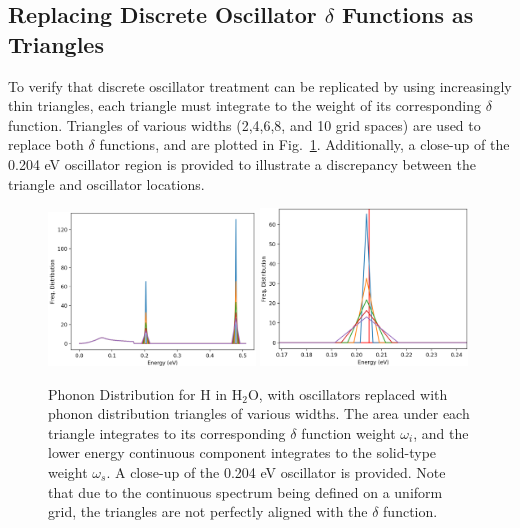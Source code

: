 \documentclass[Master.tex]{subfiles}
\begin{document}
  \subsection{Replacing Discrete Oscillator $\delta$ Functions as Triangles}
    To verify that discrete oscillator treatment can be replicated by using increasingly thin triangles, each triangle must integrate to the weight of its corresponding $\delta$ function. Triangles of various widths (2,4,6,8, and 10 grid spaces) are used to replace both $\delta$ functions, and are plotted in Fig.~\ref{fig:waterPhononTriangle}. Additionally, a close-up of the 0.204 eV oscillator region is provided to illustrate a discrepancy between the triangle and oscillator locations.
    \begin{figure}[h]
      \begin{center}
        \includegraphics[width=0.49\textwidth]{waterPhononDistTrianglesb}
        \includegraphics[width=0.49\textwidth]{waterPhononDistTrianglesZoomedb}
        \caption[Triangles of various widths approximating $\delta$ functions for H in H$_2$O]{Phonon Distribution for H in H$_2$O, with oscillators replaced with phonon distribution triangles of various widths. The area under each triangle integrates to its corresponding $\delta$ function weight $\omega_i$, and the lower energy continuous component integrates to the solid-type weight $\omega_s$. A close-up of the 0.204 eV oscillator is provided. Note that due to the continuous spectrum being defined on a uniform grid, the triangles are not perfectly aligned with the $\delta$ function.}
        \label{fig:waterPhononTriangle}
      \end{center}
    \end{figure}
\end{document}
